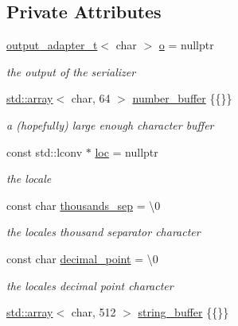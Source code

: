 \subsection*{Private Attributes}
\begin{DoxyCompactItemize}
\item 
\hyperlink{namespacenlohmann_1_1detail_a9b680ddfb58f27eb53a67229447fc556}{output\+\_\+adapter\+\_\+t}$<$ char $>$ \hyperlink{classnlohmann_1_1detail_1_1serializer_acf3c88660d3cbc65fc71c4d84f2a9f59}{o} = nullptr
\begin{DoxyCompactList}\small\item\em the output of the serializer \end{DoxyCompactList}\item 
\hyperlink{namespacenlohmann_1_1detail_a1ed8fc6239da25abcaf681d30ace4985af1f713c9e000f5d3f280adbd124df4f5}{std\+::array}$<$ char, 64 $>$ \hyperlink{classnlohmann_1_1detail_1_1serializer_a1a9d8b344a6cb47728a3519693ec03d1}{number\+\_\+buffer} \{\{\}\}
\begin{DoxyCompactList}\small\item\em a (hopefully) large enough character buffer \end{DoxyCompactList}\item 
const std\+::lconv $\ast$ \hyperlink{classnlohmann_1_1detail_1_1serializer_a1952945b7652afb59d3903cc8457a589}{loc} = nullptr
\begin{DoxyCompactList}\small\item\em the locale \end{DoxyCompactList}\item 
const char \hyperlink{classnlohmann_1_1detail_1_1serializer_a78a6ae833bb6cf7f00cb0d51db114b14}{thousands\+\_\+sep} = \textquotesingle{}\textbackslash{}0\textquotesingle{}
\begin{DoxyCompactList}\small\item\em the locale\textquotesingle{}s thousand separator character \end{DoxyCompactList}\item 
const char \hyperlink{classnlohmann_1_1detail_1_1serializer_a311e5d6f4b31d5be0eb3c0cb20b6965a}{decimal\+\_\+point} = \textquotesingle{}\textbackslash{}0\textquotesingle{}
\begin{DoxyCompactList}\small\item\em the locale\textquotesingle{}s decimal point character \end{DoxyCompactList}\item 
\hyperlink{namespacenlohmann_1_1detail_a1ed8fc6239da25abcaf681d30ace4985af1f713c9e000f5d3f280adbd124df4f5}{std\+::array}$<$ char, 512 $>$ \hyperlink{classnlohmann_1_1detail_1_1serializer_a9c9b7ca63a66e59e5e7ffe8a2acf5c8f}{string\+\_\+buffer} \{\{\}\}

\end{DoxyCompactItemize}
